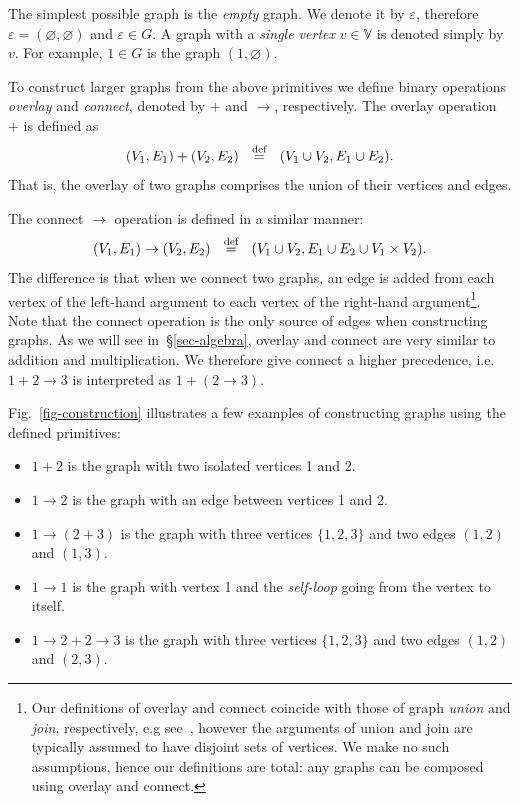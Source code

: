 The simplest possible graph is the \emph{empty} graph. We denote it by
$\varepsilon$, therefore $\varepsilon = (\varnothing, \varnothing)$ and
$\varepsilon \in G$. A graph with a \emph{single vertex} $v \in \mathbb{V}$
is denoted simply by $v$. For example, $1 \in G$ is the graph
$({1}, \varnothing)$.

To construct larger graphs from the above primitives we define binary
operations \emph{overlay} and \emph{connect}, denoted by $+$ and $\rightarrow$,
respectively. The overlay operation $+$ is defined as
\[
(V_1, E_1) + (V_2, E_2)~~\stackrel{\text{def}}{=}~~(V_1 \cup V_2, E_1 \cup E_2).
\]
That is, the overlay of two graphs comprises the union of their vertices and edges.

The connect $\rightarrow$ operation is defined in a similar manner:
\[
(V_1, E_1) \rightarrow (V_2, E_2)~~\stackrel{\text{def}}{=}~~(V_1 \cup V_2, E_1 \cup E_2 \cup V_1 \times V_2).
\]
The difference is that when we connect two graphs, an edge is added from each
vertex of the left-hand argument to each vertex of the right-hand
argument\footnote{Our definitions of overlay and connect coincide
with those of graph \emph{union} and \emph{join}, respectively,
e.g see~\citet{1969_graph_theory_harary},
however the arguments of union and join are typically assumed to have disjoint
sets of vertices. We make no such assumptions, hence our definitions are total:
any graphs can be composed using overlay and connect.
}.
Note that the connect operation is the only source of edges when constructing
graphs. As we will see in~\S\ref{sec-algebra}, overlay and connect
are very similar to addition and multiplication. We therefore give connect a higher
precedence, i.e. $1 + 2 \rightarrow 3$ is interpreted as $1 + (2 \rightarrow 3)$.

Fig.~\ref{fig-construction} illustrates a few examples of constructing graphs
using the defined primitives:
\begin{itemize}
  \item $1 + 2$ is the graph with two isolated vertices 1 and 2.
  \item $1 \rightarrow 2$ is the graph with an edge between vertices 1 and 2.
  \item $1 \rightarrow (2 + 3)$ is the graph with three vertices $\{1, 2, 3\}$
  and two edges $(1, 2)$ and $(1, 3)$.
  \item $1 \rightarrow 1$ is the graph with vertex 1 and the \emph{self-loop}
  going from the vertex to itself.
  \item $1 \rightarrow 2 + 2 \rightarrow 3$ is the graph with three vertices $\{1, 2, 3\}$
  and two edges $(1, 2)$ and $(2, 3)$.
\end{itemize}

